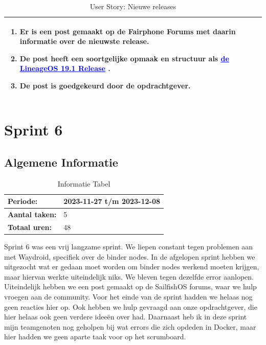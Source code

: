 \documentclass[a4paper]{report}
\newcommand{\styledhref}[2]{%
    \href{#1}{\textcolor{blue}{\underline{#2}}} %
}
\begin{document}
\begin{tcolorbox}
\begin{table}[H]
\begin{tabularx}{1\textwidth}{|X|X|}
    \begin{enumerate}[leftmargin=.4cm, topsep=0cm, itemsep=.2cm]
      \item Er is een post gemaakt op de Fairphone Forums met daarin informatie over de nieuwste release.
      \item De post heeft een soortgelijke opmaak en structuur als \styledhref{https://xdaforums.com/t/lineageos-19-1-android-12l-signature-spoofing-ota-updates-for-s8-s8-note8.4370375/}{de LineageOS 19.1 Release}.
      \item De post is goedgekeurd door de opdrachtgever.
     \end{enumerate}
    \\ 
    \hline 
        
  \end{tabularx}
  \caption{User Story: Nieuwe releases}
\label{table:it5:new_releases}
\end{table}
\end{tcolorbox}



\chapter{Sprint 6}
\section{Algemene Informatie}
\begin{table}[H]
\begin{tabularx}{0.6\textwidth}{|X|X|}
  \hline
  \cellcolor[HTML]{99ccff} \textbf{Periode:} & 2023-11-27 t/m 2023-12-08 \\ 
  \hline
  \cellcolor[HTML]{99ccff} \textbf{Aantal taken:} & 5 \\ 
  \hline
  \cellcolor[HTML]{99ccff} \textbf{Totaal uren:} & 48 \\ 
  \hline
\end{tabularx}
\caption{Informatie Tabel}
\label{table:it6:general}
\end{table}
Sprint 6 was een vrij langzame sprint. We liepen constant tegen problemen aan met Waydroid, specifiek over de binder nodes.
In de afgelopen sprint hebben we uitgezocht wat er gedaan moet worden om binder nodes werkend moeten krijgen, maar hiervan werkte uiteindelijk niks. 
We bleven tegen dezelfde error aanlopen.
Uiteindelijk hebben we een post gemaakt op de SailfishOS forums, waar we hulp vroegen aan de community. 
Voor het einde van de sprint hadden we helaas nog geen reacties hier op.
Ook hebben we hulp gevraagd aan onze opdrachtgever, die hier helaas ook geen verdere ideeën over had.
Daarnaast heb ik in deze sprint mijn teamgenoten nog geholpen bij wat errors die zich opdeden in Docker, maar hier hadden we geen aparte taak voor op het scrumboard.
\end{document}
